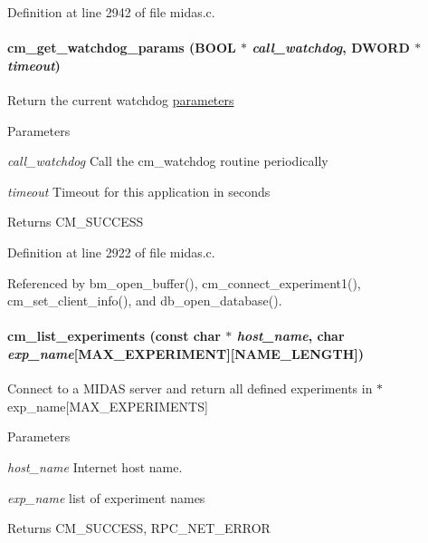 Definition at line 2942 of file midas.c.
\paragraph[{cm\_\-get\_\-watchdog\_\-params}]{ cm\_\-get\_\-watchdog\_\-params ({\bf BOOL} $\ast$ {\em call\_\-watchdog}, \/  {\bf DWORD} $\ast$ {\em timeout})}\hfill\label{group__cmfunctionc_ga1873a038ab84d2f812f92c02fed97eea}
Return the current watchdog \hyperlink{structparameters}{parameters} 
\begin{DoxyParams}{Parameters}
\item[{\em call\_\-watchdog}]Call the cm\_\-watchdog routine periodically \item[{\em timeout}]Timeout for this application in seconds \end{DoxyParams}
\begin{DoxyReturn}{Returns}
CM\_\-SUCCESS 
\end{DoxyReturn}


Definition at line 2922 of file midas.c.

Referenced by bm\_\-open\_\-buffer(), cm\_\-connect\_\-experiment1(), cm\_\-set\_\-client\_\-info(), and db\_\-open\_\-database().
\paragraph[{cm\_\-list\_\-experiments}]{ cm\_\-list\_\-experiments (const char $\ast$ {\em host\_\-name}, \/  char {\em exp\_\-name}\mbox{[}MAX\_\-EXPERIMENT\mbox{]}\mbox{[}NAME\_\-LENGTH\mbox{]})}\hfill\label{group__cmfunctionc_gad7e8e8d4f9d89c17133b09505539b351}
Connect to a MIDAS server and return all defined experiments in $\ast$exp\_\-name\mbox{[}MAX\_\-EXPERIMENTS\mbox{]} 
\begin{DoxyParams}{Parameters}
\item[{\em host\_\-name}]Internet host name. \item[{\em exp\_\-name}]list of experiment names \end{DoxyParams}
\begin{DoxyReturn}{Returns}
CM\_\-SUCCESS, RPC\_\-NET\_\-ERROR 
\end{DoxyReturn}


